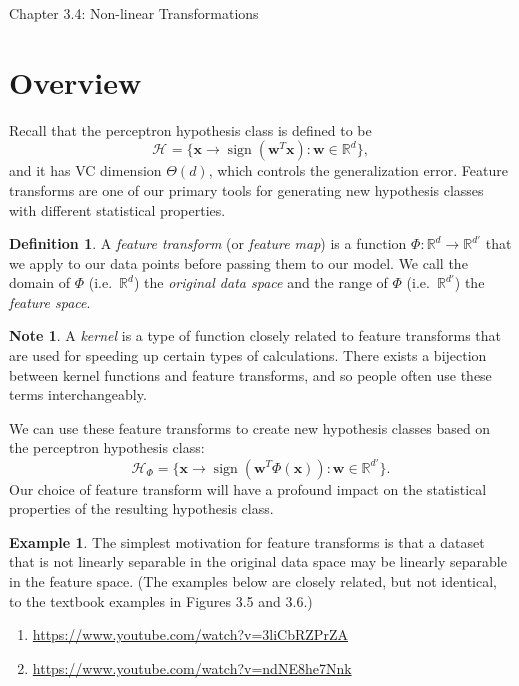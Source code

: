 \documentclass[10pt]{exam}
\theoremstyle{definition}
\newtheorem{example}{Example}
\newtheorem{note}{Note}
\newtheorem{defn}{Definition}
\newcommand{\R}{\mathbb R}
\DeclareMathOperator{\sign}{sign}
\newcommand{\trans}[1]{{#1}^{T}}
\newcommand{\w}{\mathbf w}
\newcommand{\x}{\mathbf x}
\newcommand{\HH}[1]{\mathcal H_{\text{#1}}}
\begin{document}
\begin{center}
{
\Huge
Chapter 3.4: Non-linear Transformations
}
\end{center}

\section*{Overview}

Recall that the perceptron hypothesis class is defined to be
\begin{equation}
    \HH{} = \bigg\{ \x \to \sign(\trans\w\x) : \w \in \R^d \bigg\},
\end{equation}
and it has VC dimension $\Theta(d)$, which controls the generalization error.
Feature transforms are one of our primary tools for generating new hypothesis classes with different statistical properties.
    \begin{defn}
    A \emph{feature transform} (or \emph{feature map}) is a function $\Phi : \R^d \to \R^{d'}$ that we apply to our data points before passing them to our model.
        We call the domain of $\Phi$ (i.e.\ $\R^d$) the \emph{original data space} and the range of $\Phi$ (i.e.\ $\R^{d'}$) the \emph{feature space}.
    \end{defn}
    \begin{note}
        A \emph{kernel} is a type of function closely related to feature transforms that are used for speeding up certain types of calculations.
        There exists a bijection between kernel functions and feature transforms,
        and so people often use these terms interchangeably.
    \end{note}
    We can use these feature transforms to create new hypothesis classes based on the perceptron hypothesis class:
\begin{equation}
    \HH{$\Phi$} = \bigg\{ \x \to \sign(\trans\w\Phi(\x)) : \w \in \R^{d'} \bigg\}.
\end{equation}
Our choice of feature transform will have a profound impact on the statistical properties of the resulting hypothesis class.

\begin{example}
    The simplest motivation for feature transforms is that a dataset that is not linearly separable in the original data space may be linearly separable in the feature space.
    (The examples below are closely related, but not identical, to the textbook examples in Figures 3.5 and 3.6.)
    \begin{enumerate}
        \item \url{https://www.youtube.com/watch?v=3liCbRZPrZA}
            \vspace{2in}
            \newpage
        \item \url{https://www.youtube.com/watch?v=ndNE8he7Nnk}
            \vspace{2in}

    \end{enumerate}
\end{example}
\end{document}
